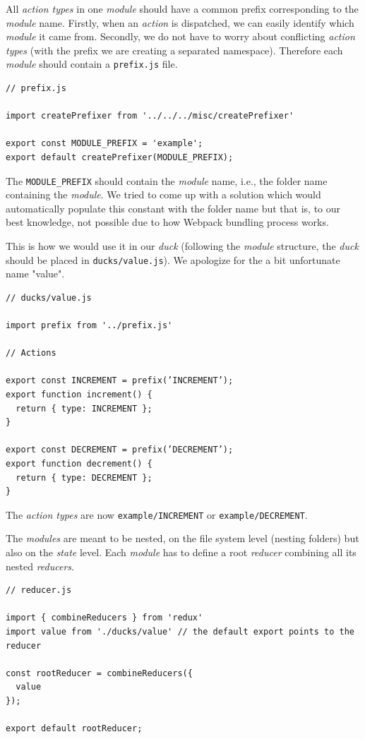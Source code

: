 All \emph{action types} in one \emph{module} should have a common prefix corresponding to the \emph{module} name. Firstly, when an \emph{action} is dispatched, we can easily identify which \emph{module} it came from. Secondly, we do not have to worry about conflicting \emph{action types} (with the prefix we are creating a separated namespace). Therefore each \emph{module} should contain a \texttt{prefix.js} file.

\begin{verbatim}
// prefix.js

import createPrefixer from '../../../misc/createPrefixer'

export const MODULE_PREFIX = 'example';
export default createPrefixer(MODULE_PREFIX);
\end{verbatim}

The \texttt{MODULE\_PREFIX} should contain the \emph{module} name, i.e., the folder name containing the \emph{module}. We tried to come up with a solution which would automatically populate this constant with the folder name but that is, to our best knowledge, not possible due to how Webpack bundling process works. 

This is how we would use it in our \emph{duck} (following the \emph{module} structure, the \emph{duck} should be placed in \texttt{ducks/value.js}). We apologize for the a bit unfortunate name "value".

\begin{verbatim}
// ducks/value.js

import prefix from '../prefix.js'

// Actions 

export const INCREMENT = prefix(’INCREMENT’);
export function increment() {
  return { type: INCREMENT };
}

export const DECREMENT = prefix(’DECREMENT’);
export function decrement() {
  return { type: DECREMENT };
}
\end{verbatim}

The \emph{action types} are now \texttt{example/INCREMENT} or \texttt{example/DECREMENT}.

The \emph{modules} are meant to be nested, on the file system level (nesting folders) but also on the \emph{state} level.  Each \emph{module} has to define a root \emph{reducer} combining all its nested \emph{reducers}.

\begin{verbatim}
// reducer.js

import { combineReducers } from 'redux'
import value from './ducks/value' // the default export points to the reducer

const rootReducer = combineReducers({
  value
});

export default rootReducer;
\end{verbatim}

